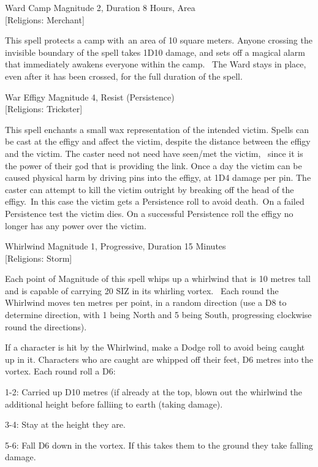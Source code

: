 \begin{samepage}
\begin{rpg-spell}
{Ward Camp}
{Magnitude 2, Duration 8 Hours, Area\\{[Religions: Merchant]}}

This spell protects a camp with an area of 10 square meters. Anyone crossing the invisible boundary of the spell takes 1D10 damage, and sets off a magical alarm that immediately awakens everyone within the camp.  The Ward stays in place, even after it has been crossed, for the full duration of the spell.
\end{rpg-spell}
\end{samepage}

\begin{samepage}
\begin{rpg-spell}
{War Effigy}
{Magnitude 4, Resist (Persistence)\\{[Religions: Trickster]}}

This spell enchants a small wax representation of the intended victim. Spells can be cast at the effigy and affect the victim, despite the distance between the effigy and the victim. The caster need not need have seen/met the victim,  since it is the power of their god that is providing the link. Once a day the victim can be caused physical harm by driving pins into the effigy, at 1D4 damage per pin. The caster can attempt to kill the victim outright by breaking off the head of the effigy. In this case the victim gets a Persistence roll to avoid death. On a failed Persistence test the victim dies. On a successful Persistence roll the effigy no longer has any power over the victim.
\end{rpg-spell}
\end{samepage}

\begin{samepage}
\begin{rpg-spell}
{Whirlwind}
{Magnitude 1, Progressive, Duration 15 Minutes\\{[Religions: Storm]}}

Each point of Magnitude of this spell whips up a whirlwind that is 10 metres tall and is capable of carrying 20 SIZ in its whirling vortex.  Each round the Whirlwind moves ten metres per point, in a random direction (use a D8 to determine direction, with 1 being North and 5 being South, progressing clockwise round the directions). 

If a character is hit by the Whirlwind, make a Dodge roll to avoid being caught up in it. Characters who are caught are whipped off their feet, D6 metres into the vortex. Each round roll a D6:
\begin{rpg-list}
\item 1-2: Carried up D10 metres (if already at the top, blown out the whirlwind the additional height before falliing to earth (taking damage).
\item 3-4: Stay at the height they are.
\item 5-6: Fall D6 down in the vortex. If this takes them to the ground they take falling damage.
\end{rpg-list}
\end{rpg-spell}
\end{samepage}


